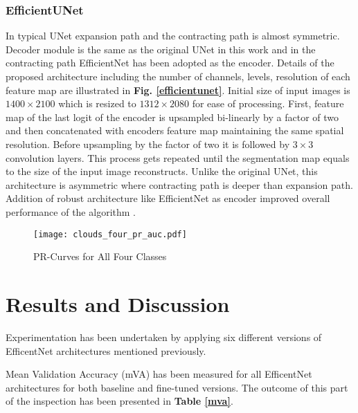 \documentclass[conference]{IEEEtran}
\begin{document}
\subsubsection{EfficientUNet}\label{effunet}
In typical UNet expansion path and the contracting path is almost symmetric. Decoder module is the same as the original UNet in this work and in the contracting path EfficientNet has been adopted as the encoder. Details of the proposed architecture including the number of channels, levels, resolution of each feature map are illustrated in \textbf{Fig. \ref{efficientunet}}. Initial size of input images is $1400\times2100$ which is resized to $1312\times2080$ for ease of processing. First, feature map of the last logit of the encoder is upsampled bi-linearly by a factor of two and then concatenated with encoders feature map maintaining the same spatial resolution. Before upsampling by the factor of two it is followed by $3\times3$ convolution layers. This process gets repeated until the segmentation map equals to the size of the input image reconstructs. Unlike the original UNet, this architecture is asymmetric where contracting path is deeper than expansion path. Addition of robust architecture like EfficientNet as encoder improved overall performance of the algorithm \cite{baheti2020eff}.

\begin{figure*}
 \center
  \texttt{[image: clouds\_four\_pr\_auc.pdf]}
  \caption{PR-Curves for All Four Classes}
  \label{AAA}
\end{figure*}

\section{Results and Discussion}
Experimentation has been undertaken by applying six different versions of EfficentNet architectures mentioned previously.

Mean Validation Accuracy (mVA) has been measured for all EfficentNet architectures for both baseline and fine-tuned versions.
The outcome of this part of the inspection has been presented in \textbf{Table \ref{mva}}.
\end{document}
